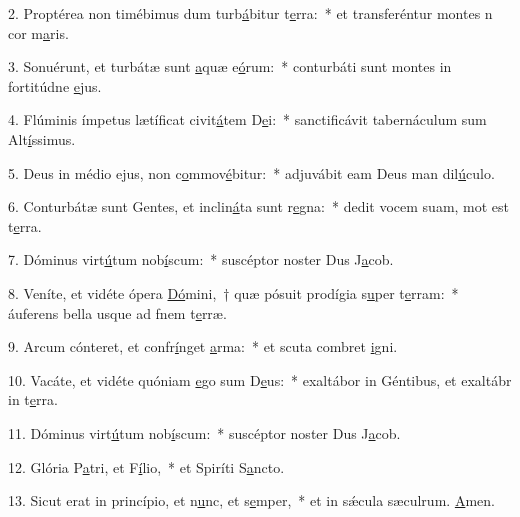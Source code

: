 2. Proptérea non timébimus dum turb\uline{á}bitur t\uline{e}rra:~* et transferéntur montes n cor m\uline{a}ris.\par 
3. Sonuérunt, et turbátæ sunt \uline{a}quæ e\uline{ó}rum:~* conturbáti sunt montes in fortitúdne \uline{e}jus.\par 
4. Flúminis ímpetus lætíficat civit\uline{á}tem D\uline{e}i:~* sanctificávit tabernáculum sum Alt\uline{í}ssimus.\par 
5. Deus in médio ejus, non c\uline{o}mmov\uline{é}bitur:~* adjuvábit eam Deus man dil\uline{ú}culo.\par 
6. Conturbátæ sunt Gentes, et inclin\uline{á}ta sunt r\uline{e}gna:~* dedit vocem suam, mot est t\uline{e}rra.\par 
7. Dóminus virt\uline{ú}tum nob\uline{í}scum:~* suscéptor noster Dus J\uline{a}cob.\par 
8. Veníte, et vidéte ópera \uline{Dó}mini,~† quæ pósuit prodígia s\uline{u}per t\uline{e}rram:~* áuferens bella usque ad fnem t\uline{e}rræ.\par 
9. Arcum cónteret, et confr\uline{í}nget \uline{a}rma:~* et scuta combret \uline{i}gni.\par 
10. Vacáte, et vidéte quóniam \uline{e}go sum D\uline{e}us:~* exaltábor in Géntibus, et exaltábr in t\uline{e}rra.\par 
11. Dóminus virt\uline{ú}tum nob\uline{í}scum:~* suscéptor noster Dus J\uline{a}cob.\par 
12. Glória P\uline{a}tri, et F\uline{í}lio,~* et Spiríti S\uline{a}ncto.\par 
13. Sicut erat in princípio, et n\uline{u}nc, et s\uline{e}mper,~* et in sǽcula sæculrum. \uline{A}men.\par 
